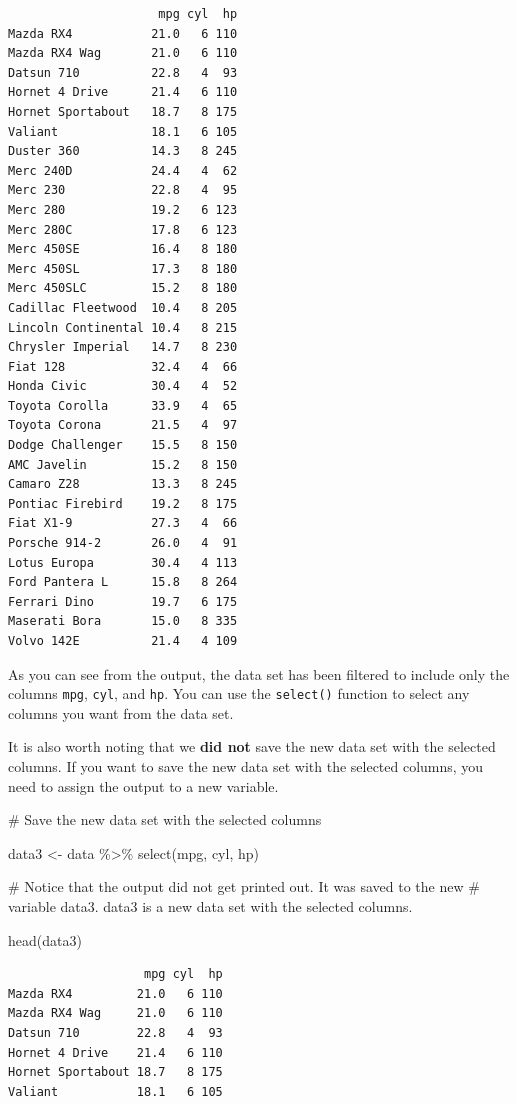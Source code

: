 \documentclass[
  letterpaper,
  DIV=11,
  numbers=noendperiod]{scrreprt}
\newenvironment{Shaded}{\begin{snugshade}}{\end{snugshade}}
\newcommand{\CommentTok}[1]{\textcolor[rgb]{0.37,0.37,0.37}{#1}}
\newcommand{\FunctionTok}[1]{\textcolor[rgb]{0.28,0.35,0.67}{#1}}
\newcommand{\NormalTok}[1]{\textcolor[rgb]{0.00,0.23,0.31}{#1}}
\newcommand{\OtherTok}[1]{\textcolor[rgb]{0.00,0.23,0.31}{#1}}
\newcommand{\SpecialCharTok}[1]{\textcolor[rgb]{0.37,0.37,0.37}{#1}}
\begin{document}
\begin{verbatim}
                     mpg cyl  hp
Mazda RX4           21.0   6 110
Mazda RX4 Wag       21.0   6 110
Datsun 710          22.8   4  93
Hornet 4 Drive      21.4   6 110
Hornet Sportabout   18.7   8 175
Valiant             18.1   6 105
Duster 360          14.3   8 245
Merc 240D           24.4   4  62
Merc 230            22.8   4  95
Merc 280            19.2   6 123
Merc 280C           17.8   6 123
Merc 450SE          16.4   8 180
Merc 450SL          17.3   8 180
Merc 450SLC         15.2   8 180
Cadillac Fleetwood  10.4   8 205
Lincoln Continental 10.4   8 215
Chrysler Imperial   14.7   8 230
Fiat 128            32.4   4  66
Honda Civic         30.4   4  52
Toyota Corolla      33.9   4  65
Toyota Corona       21.5   4  97
Dodge Challenger    15.5   8 150
AMC Javelin         15.2   8 150
Camaro Z28          13.3   8 245
Pontiac Firebird    19.2   8 175
Fiat X1-9           27.3   4  66
Porsche 914-2       26.0   4  91
Lotus Europa        30.4   4 113
Ford Pantera L      15.8   8 264
Ferrari Dino        19.7   6 175
Maserati Bora       15.0   8 335
Volvo 142E          21.4   4 109
\end{verbatim}

As you can see from the output, the data set has been filtered to
include only the columns \texttt{mpg}, \texttt{cyl}, and \texttt{hp}.
You can use the \texttt{select()} function to select any columns you
want from the data set.

It is also worth noting that we \textbf{did not} save the new data set
with the selected columns. If you want to save the new data set with the
selected columns, you need to assign the output to a new variable.

\begin{Shaded}
\begin{Highlighting}[]
\CommentTok{\# Save the new data set with the selected columns}

\NormalTok{data3 }\OtherTok{\textless{}{-}}\NormalTok{ data }\SpecialCharTok{\%\textgreater{}\%}
  \FunctionTok{select}\NormalTok{(mpg, cyl, hp)}

\CommentTok{\# Notice that the output did not get printed out. It was saved to the new}
\CommentTok{\# variable data3. data3 is a new data set with the selected columns.}

\FunctionTok{head}\NormalTok{(data3)}
\end{Highlighting}
\end{Shaded}

\begin{verbatim}
                   mpg cyl  hp
Mazda RX4         21.0   6 110
Mazda RX4 Wag     21.0   6 110
Datsun 710        22.8   4  93
Hornet 4 Drive    21.4   6 110
Hornet Sportabout 18.7   8 175
Valiant           18.1   6 105
\end{verbatim}
\end{document}
